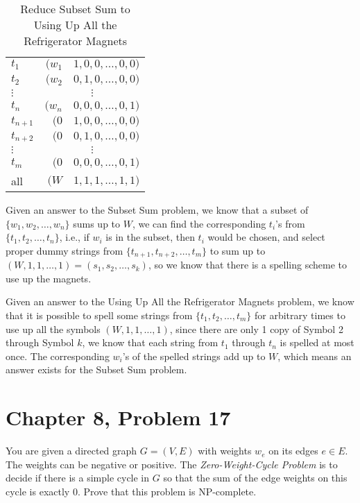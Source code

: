 \documentclass[12pt,letterpaper]{article}
\begin{document}
\begin{table}
\begin{center}
\caption{Reduce Subset Sum to Using Up All the Refrigerator Magnets}
\vspace{1ex}
\begin{tabular}{l|r@{,}l}
$t_1$ & $(w_1$ & $1, 0, 0, \dots, 0, 0)$\\
$t_2$ & $(w_2$ & $0, 1, 0, \dots, 0, 0)$\\
$\vdots$ & \multicolumn{2}{c}{$\vdots$}\\
$t_n$ & $(w_n$ & $0, 0, 0, \dots, 0, 1)$\\
$t_{n+1}$ & $(0$ & $1, 0, 0, \dots, 0, 0)$\\
$t_{n+2}$ & $(0$ & $0, 1, 0, \dots, 0, 0)$\\
$\vdots$ & \multicolumn{2}{c}{$\vdots$}\\
$t_{m}$ & $(0$ & $0, 0, 0, \dots, 0, 1)$\\
\hline
all & $(W$ & $1, 1, 1, \dots, 1, 1)$
\end{tabular}
\end{center}
\end{table}

Given an answer to the Subset Sum problem, we know that a subset of $\{w_1, w_2, \dots, w_n\}$ sums up to $W$, we can find the corresponding $t_i$'s from $\{t_1, t_2, \dots, t_n\}$, i.e., if $w_i$ is in the subset, then $t_i$ would be chosen, and select proper dummy strings from $\{t_{n+1}, t_{n+2}, \dots, t_m\}$ to sum up to $(W, 1, 1, \dots, 1)=(s_1, s_2, \dots, s_k)$, so we know that there is a spelling scheme to use up the magnets.

Given an answer to the Using Up All the Refrigerator Magnets problem, we know that it is possible to spell some strings from $\{t_1, t_2, \dots, t_m\}$ for arbitrary times to use up all the symbols $(W, 1, 1, \dots, 1)$, since there are only 1 copy of Symbol 2 through Symbol $k$, we know that each string from $t_1$ through $t_n$ is spelled at most once. The corresponding $w_i$'s of the spelled strings add up to $W$, which means an answer exists for the Subset Sum problem.

\section*{Chapter 8, Problem 17}
You are given a directed graph $G = (V, E)$ with weights $w_e$ on its edges $e \in E$.
The weights can be negative or positive. The \emph{Zero-Weight-Cycle Problem}
is to decide if there is a simple cycle in $G$ so that the sum of the edge
weights on this cycle is exactly 0. Prove that this problem is NP-complete.
\end{document}
